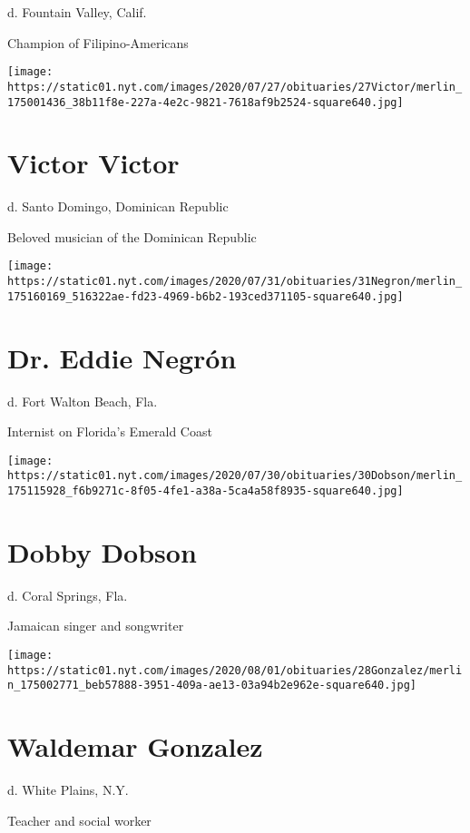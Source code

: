 d. Fountain Valley, Calif.

Champion of Filipino-Americans

\texttt{[image: https://static01.nyt.com/images/2020/07/27/obituaries/27Victor/merlin\_175001436\_38b11f8e-227a-4e2c-9821-7618af9b2524-square640.jpg]}

\hypertarget{victor-victor}{%
\section{Victor Victor}\label{victor-victor}}

d. Santo Domingo, Dominican Republic

Beloved musician of the Dominican Republic

\texttt{[image: https://static01.nyt.com/images/2020/07/31/obituaries/31Negron/merlin\_175160169\_516322ae-fd23-4969-b6b2-193ced371105-square640.jpg]}

\hypertarget{dr-eddie-negruxf3n}{%
\section{Dr. Eddie Negrón}\label{dr-eddie-negruxf3n}}

d. Fort Walton Beach, Fla.

Internist on Florida's Emerald Coast

\texttt{[image: https://static01.nyt.com/images/2020/07/30/obituaries/30Dobson/merlin\_175115928\_f6b9271c-8f05-4fe1-a38a-5ca4a58f8935-square640.jpg]}

\hypertarget{dobby-dobson}{%
\section{Dobby Dobson}\label{dobby-dobson}}

d. Coral Springs, Fla.

Jamaican singer and songwriter

\texttt{[image: https://static01.nyt.com/images/2020/08/01/obituaries/28Gonzalez/merlin\_175002771\_beb57888-3951-409a-ae13-03a94b2e962e-square640.jpg]}

\hypertarget{waldemar-gonzalez}{%
\section{Waldemar Gonzalez}\label{waldemar-gonzalez}}

d. White Plains, N.Y.

Teacher and social worker

